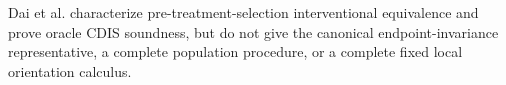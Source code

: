 Dai et al. characterize pre-treatment-selection interventional equivalence and prove oracle CDIS soundness, but do not give the canonical endpoint-invariance representative, a complete population procedure, or a complete fixed local orientation calculus.